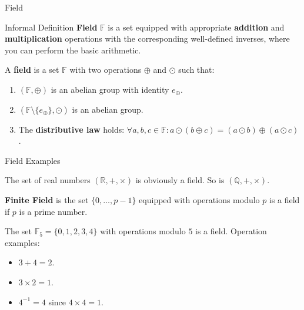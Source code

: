 \documentclass{beamer}
\begin{document}
  \begin{frame}{Field}
    \begin{block}{Informal Definition}
        \textbf{Field} $\mathbb{F}$ is a set equipped with appropriate \textbf{addition} and \textbf{multiplication} operations with the corresponding well-defined inverses, where you can perform the basic arithmetic.
    \end{block}
    
      \begin{definition}
        A \textbf{field} is a set $\mathbb{F}$ with two operations $\oplus$ and $\odot$ such that:
        \begin{enumerate}
            \item $(\mathbb{F}, \oplus)$ is an abelian group with identity $e_{\oplus}$.
            \item $(\mathbb{F} \setminus \{e_{\oplus}\}, \odot)$ is an abelian group.
            \item The \textbf{distributive law} holds: $\forall a,b,c \in \mathbb{F}: a \odot (b \oplus c) = (a \odot b) \oplus (a \odot c)$.
        \end{enumerate}
      \end{definition}
    \end{frame}

    \begin{frame}{Field Examples}
      \begin{example}
        The set of real numbers $(\mathbb{R}, +, \times)$ is obviously a field. So is $(\mathbb{Q}, +, \times)$.
    \end{example}

    \begin{definition}
      \textbf{Finite Field} is the set $\{0,\dots,p-1\}$ equipped with operations modulo $p$ is a field if $p$ is a prime number.
    \end{definition}

    \begin{example}
      The set $\mathbb{F}_5 = \{0,1,2,3,4\}$ with operations modulo $5$ is a field. Operation examples:
      \begin{itemize}
        \item $3 + 4 = 2$.
        \item $3 \times 2 = 1$.
        \item $4^{-1} = 4$ since $4 \times 4 = 1$.
      \end{itemize}
    \end{example}
    \end{frame}
\end{document}
